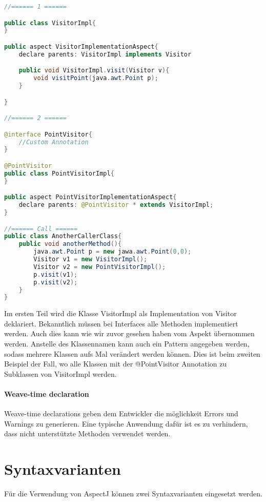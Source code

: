 \begin{lstlisting}[language=Java]
//====== 1 ======

public class VisitorImpl{
}

public aspect VisitorImplementationAspect{
	declare parents: VisitorImpl implements Visitor

	public void VisitorImpl.visit(Visitor v){
		void visitPoint(java.awt.Point p);
	}

}

//====== 2 ======

@interface PointVisitor{
	//Custom Annotation
}

@PointVisitor
public class PointVisitorImpl{
}

public aspect PointVisitorImplementationAspect{
	declare parents: @PointVisitor * extends VisitorImpl;
}

//====== Call ======
public class AnotherCallerClass{
	public void anotherMethod(){
		java.awt.Point p = new jawa.awt.Point(0,0);
		Visitor v1 = new VisitorImpl();
		Visitor v2 = new PointVisitorImpl();
		p.visit(v1);
		p.visit(v2);
	}
}
\end{lstlisting}

Im ersten Teil wird die Klasse VisitorImpl als Implementation von Visitor deklariert. Bekanntlich müssen bei Interfaces alle Methoden implementiert werden. Auch dies kann wie wir zuvor gesehen haben vom Aspekt übernommen werden.
Anstelle des Klassennamen kann auch ein Pattern angegeben werden, sodass mehrere Klassen aufs Mal verändert werden können. Dies ist beim zweiten Beispiel der Fall, wo alle Klassen mit der @PointVisitor Annotation zu Subklassen von VisitorImpl werden.

\paragraph{Weave-time declaration}
Weave-time declarations geben dem Entwickler die möglichkeit Errors und Warnings zu generieren. Eine typische Anwendung dafür ist es zu verhindern, dass nicht unterstützte Methoden verwendet werden.

\section{Syntaxvarianten}
Für die Verwendung von AspectJ können zwei Syntaxvarianten eingesetzt werden.

